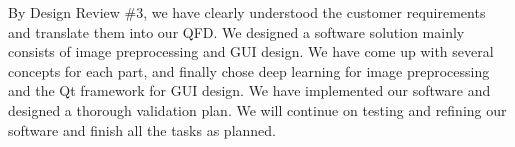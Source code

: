 By Design Review \#3, we have clearly understood the customer requirements and translate them into our QFD. We designed a software solution mainly consists of image preprocessing and GUI design. We have come up with several concepts for each part, and finally chose deep learning for image preprocessing and the Qt framework for GUI design. We have implemented our software and designed a thorough validation plan. We will continue on testing and refining our software and finish all the tasks as planned.